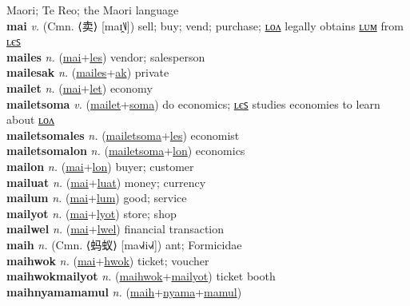 Maori; Te Reo; the Maori language \label{'maolitilip} \\
\textbf{mai} \textit{v.} (Cmn. ⟨卖⟩ [maɪ̯˥˩])
sell; buy; vend; purchase; \hyperref[mailon]{ʟᴏᴧ} legally obtains \hyperref[mailum]{ʟᴜᴍ} from \hyperref[mailes]{ʟєꜱ} \label{mai} \\
\textbf{mailes} \textit{n.} (\hyperref[mai]{mai}+\hyperref[les]{les})
vendor; salesperson \label{mailes} \\
\textbf{mailesak} \textit{n.} (\hyperref[mailes]{mailes}+\hyperref[ak]{ak})
private \label{mailesak} \\
\textbf{mailet} \textit{n.} (\hyperref[mai]{mai}+\hyperref[let]{let})
economy \label{mailet} \\
\textbf{mailetsoma} \textit{v.} (\hyperref[mailet]{mailet}+\hyperref[soma]{soma})
do economics; \hyperref[mailetsomales]{ʟєꜱ} studies economies to learn about \hyperref[mailetsomalon]{ʟᴏᴧ} \label{mailetsoma} \\
\textbf{mailetsomales} \textit{n.} (\hyperref[mailetsoma]{mailetsoma}+\hyperref[les]{les})
economist \label{mailetsomales} \\
\textbf{mailetsomalon} \textit{n.} (\hyperref[mailetsoma]{mailetsoma}+\hyperref[lon]{lon})
economics \label{mailetsomalon} \\
\textbf{mailon} \textit{n.} (\hyperref[mai]{mai}+\hyperref[lon]{lon})
buyer; customer \label{mailon} \\
\textbf{mailuat} \textit{n.} (\hyperref[mai]{mai}+\hyperref[luat]{luat})
money; currency \label{mailuat} \\
\textbf{mailum} \textit{n.} (\hyperref[mai]{mai}+\hyperref[lum]{lum})
good; service \label{mailum} \\
\textbf{mailyot} \textit{n.} (\hyperref[mai]{mai}+\hyperref[lyot]{lyot})
store; shop \label{mailyot} \\
\textbf{mailwel} \textit{n.} (\hyperref[mai]{mai}+\hyperref[lwel]{lwel})
financial transaction \label{mailwel} \\
\textbf{maih} \textit{n.} (Cmn. ⟨蚂蚁⟩ [ma˧˩˧i˧˩˧])
ant; Formicidae \label{maih} \\
\textbf{maihwok} \textit{n.} (\hyperref[mai]{mai}+\hyperref[hwok]{hwok})
ticket; voucher \label{maihwok} \\
\textbf{maihwokmailyot} \textit{n.} (\hyperref[maihwok]{maihwok}+\hyperref[mailyot]{mailyot})
ticket booth \label{maihwokmailyot} \\
\textbf{maihnyamamamul} \textit{n.} (\hyperref[maih]{maih}+\hyperref[nyama]{nyama}+\hyperref[mamul]{mamul})
